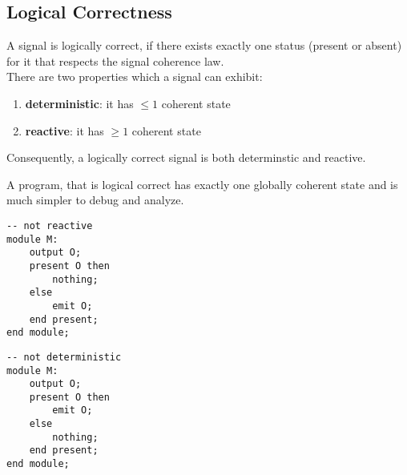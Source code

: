 \documentclass[fs, footer]{latex4ei}
\begin{document}
\begin{multicols*}{4}
{\subsection{Logical Correctness}
A signal is logically correct, if there exists exactly one status (present or absent) for it that respects the signal coherence law.\\
There are two properties which a signal can exhibit:
\begin{enumerate}
\item \textbf{deterministic}: it has $\le 1$ coherent state
\item \textbf{reactive}: it has $\ge 1$ coherent state
\end{enumerate}
Consequently, a logically correct signal is both determinstic and reactive.

A program, that is logical correct has exactly one globally coherent state and is much simpler to debug and analyze.
}
\begin{minipage}{.49\columnwidth}
\begin{lstlisting}
-- not reactive
module M:
	output O;
	present O then
		nothing;
	else
		emit O;
	end present;
end module;
\end{lstlisting}
\end{minipage}
\begin{minipage}{.49\columnwidth}
\begin{lstlisting}
-- not deterministic
module M:
	output O;
	present O then
		emit O;
	else
		nothing;
	end present;
end module;
\end{lstlisting}
\end{minipage}

\sectionbox{
}
\end{multicols*}
\end{document}
